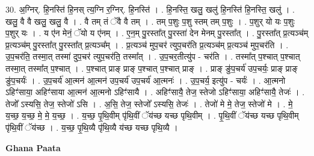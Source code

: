 \documentclass[17pt]{extarticle}
\begin{document}
30. अ॒ग्निर्. हि॒नस्ति॑ हि॒नस् त्य॒ग्नि र॒ग्निर्. हि॒नस्ति॑ । . हि॒नस्ति॒ खलु॒ खलु॑ हि॒नस्ति॑ हि॒नस्ति॒ खलु॑ । . खलु॒ वै वै खलु॒ खलु॒ वै । . वै तम् तं ॅवै वै तम् । . तम् प॒शुः प॒शु स्तम् तम् प॒शुः । . प॒शुर् यो यः प॒शुः प॒शुर् यः । . य ए॑न मेनं॒ ॅयो य ए॑नम् । . ए॒न॒म् पु॒रस्ता᳚त् पु॒रस्ता॑ देन मेनम् पु॒रस्ता᳚त् । . पु॒रस्ता᳚त् प्र॒त्यञ्च॑म् प्र॒त्यञ्च॑म् पु॒रस्ता᳚त् पु॒रस्ता᳚त् प्र॒त्यञ्च᳚म् । . प्र॒त्यञ्च॑ मुप॒चर॑ त्युप॒चर॑ति प्र॒त्यञ्च॑म् प्र॒त्यञ्च॑ मुप॒चर॑ति । . उ॒प॒चर॑ति॒ तस्मा॒त् तस्मा॑ दुप॒चर॑ त्युप॒चर॑ति॒ तस्मा᳚त् । . उ॒प॒चर॒तीत्यु॑प - चर॑ति । . तस्मा᳚त् प॒श्चात् प॒श्चात् तस्मा॒त् तस्मा᳚त् प॒श्चात् । . प॒श्चात् प्राङ् प्राङ् प॒श्चात् प॒श्चात् प्राङ् । . प्राङ् ङु॑प॒चर्य॑ उप॒चर्यः॒ प्राङ् प्राङ् ङु॑प॒चर्यः॑ । . उ॒प॒चर्य॑ आ॒त्मन॑ आ॒त्मन॑ उप॒चर्य॑ उप॒चर्य॑ आ॒त्मनः॑ । . उ॒प॒चर्य॒ इत्यु॑प - चर्यः॑ । . आ॒त्मनो ऽहिꣳ॑साया॒ अहिꣳ॑साया आ॒त्मन॑ आ॒त्मनो ऽहिꣳ॑सायै । . अहिꣳ॑सायै॒ तेज॒ स्तेजो ऽहिꣳ॑साया॒ अहिꣳ॑सायै॒ तेजः॑ । . तेजो᳚ ऽस्यसि॒ तेज॒ स्तेजो॑ ऽसि । . अ॒सि॒ तेज॒ स्तेजो᳚ ऽस्यसि॒ तेजः॑ । . तेजो॑ मे मे॒ तेज॒ स्तेजो॑ मे । . मे॒ य॒च्छ॒ य॒च्छ॒ मे॒ मे॒ य॒च्छ॒ । . य॒च्छ॒ पृ॒थि॒वीम् पृ॑थि॒वीं ॅय॑च्छ यच्छ पृथि॒वीम् । . पृ॒थि॒वीं ॅय॑च्छ यच्छ पृथि॒वीम् पृ॑थि॒वीं ॅय॑च्छ । . य॒च्छ॒ पृ॒थि॒व्यै पृ॑थि॒व्यै य॑च्छ यच्छ पृथि॒व्यै । \newline

\textbf{Ghana Paata } \newline
\end{document}
